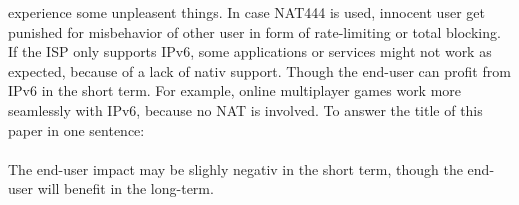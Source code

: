 \documentclass[format=sigconf, natbib=true, nonacm=true]{acmart}
\begin{document}
experience some unpleasent things. In case NAT444 is used, innocent user get punished for misbehavior of other user in form of rate-limiting or total blocking. If the ISP only supports IPv6, some applications or services might not work as expected, because of a lack of nativ support. Though the end-user can profit from IPv6 in the short term. For example, online multiplayer games work more seamlessly with IPv6, because no NAT is involved. To answer the title of this paper in one sentence:\\\\The end-user impact may be slighly negativ in the short term, though the end-user will benefit in the long-term.

    
    
\end{document}
